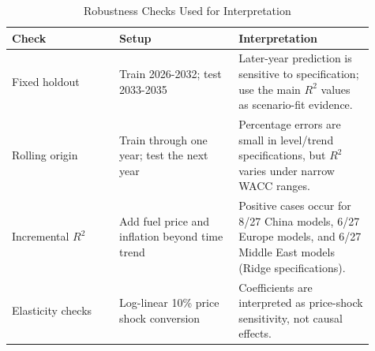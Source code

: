 \begin{table}[t]
\centering
\caption{Robustness Checks Used for Interpretation}
\label{tab:robustness}
\scriptsize
\begin{tabular}{P{0.27\linewidth}P{0.30\linewidth}P{0.34\linewidth}}
\toprule
\textbf{Check} & \textbf{Setup} & \textbf{Interpretation} \\
\midrule
Fixed holdout & Train 2026-2032; test 2033-2035 & Later-year prediction is sensitive to specification; use the main $R^2$ values as scenario-fit evidence. \\
Rolling origin & Train through one year; test the next year & Percentage errors are small in level/trend specifications, but $R^2$ varies under narrow WACC ranges. \\
Incremental $R^2$ & Add fuel price and inflation beyond time trend & Positive cases occur for 8/27 China models, 6/27 Europe models, and 6/27 Middle East models (Ridge specifications). \\
Elasticity checks & Log-linear 10\% price shock conversion & Coefficients are interpreted as price-shock sensitivity, not causal effects. \\
\bottomrule
\end{tabular}
\end{table}
